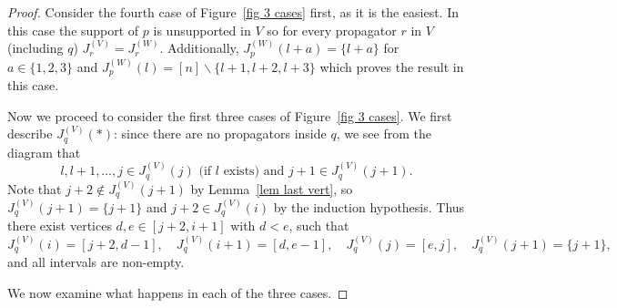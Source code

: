 \documentclass[11pt]{article}
\theoremstyle{remark}
\theoremstyle{definition}
\begin{document}
\begin{proof}
Consider the fourth case of Figure~\ref{fig 3 cases} first, as it is the easiest.  In this case the support of $p$ is unsupported in $V$ so for every propagator $r$ in $V$ (including $q$) $J_r^{(V)} = J_r^{(W)}$.  Additionally, $J_p^{(W)}(l+a) = \{l+a\}$ for $a\in\{1,2,3\}$ and $J_p^{(W)}(l) = [n] \backslash \{l+1, l+2, l+3\}$ which proves the result in this case.


Now we proceed to consider the first three cases of Figure~\ref{fig 3 cases}.
We first describe $J_q^{(V)}(*)$: since there are no propagators inside $q$, we see from the diagram that
\[l, l+1, \ldots ,j \in J^{(V)}_q(j) \text{ (if $l$ exists) and }  j+1 \in J^{(V)}_q(j+1).\]
Note that $j+2 \not\in J^{(V)}_q(j+1)$ by Lemma~\ref{lem last vert}, so $J^{(V)}_q(j+1) = \{j+1\}$ and $j+2 \in J^{(V)}_q(i)$ by the induction hypothesis. Thus there exist vertices $d,e \in [j+2,i+1]$ with $d <e$, such that
\[J^{(V)}_q(i) = [j+2,d-1], \quad J^{(V)}_q(i+1) = [d,e-1], \quad J^{(V)}_q(j) = [e,j], \quad J^{(V)}_q(j+1) = \{j+1\},\]
and all intervals are non-empty.




We now examine what happens in each of the three cases.



\end{proof}
\end{document}
